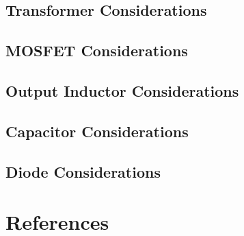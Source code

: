\documentclass{article}
\begin{document}
\subsection{Transformer Considerations}
\subsection{MOSFET Considerations}
\subsection{Output Inductor Considerations}
\subsection{Capacitor Considerations}
\subsection{Diode Considerations}
\section{References}
\end{document}
